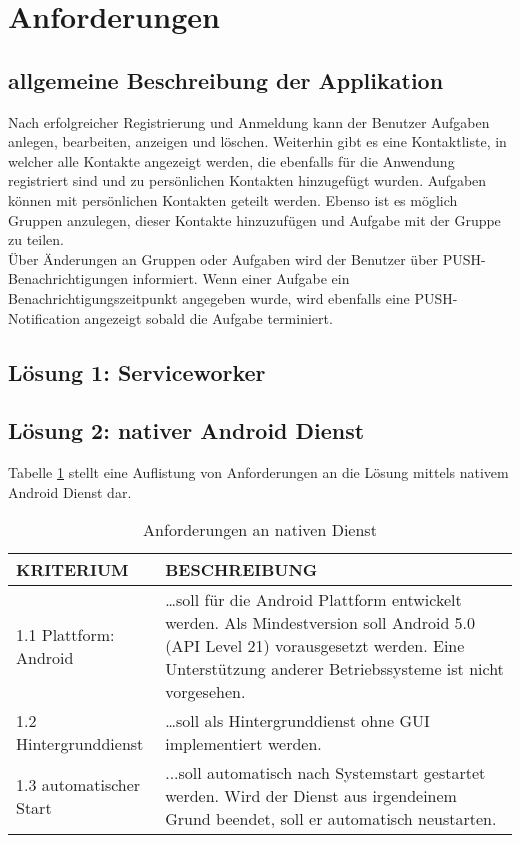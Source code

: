 \section{Anforderungen}

\subsection{allgemeine Beschreibung der Applikation}

Nach erfolgreicher Registrierung und Anmeldung kann der Benutzer Aufgaben anlegen, bearbeiten, anzeigen und löschen. Weiterhin gibt es eine Kontaktliste, in welcher alle Kontakte angezeigt werden, die ebenfalls für die Anwendung registriert sind und zu persönlichen Kontakten hinzugefügt wurden. Aufgaben können mit persönlichen Kontakten geteilt werden. Ebenso ist es möglich Gruppen anzulegen, dieser Kontakte hinzuzufügen und Aufgabe mit der Gruppe zu teilen. \\

Über Änderungen an Gruppen oder Aufgaben wird der Benutzer über PUSH-Benachrichtigungen informiert. Wenn einer Aufgabe ein Benachrichtigungszeitpunkt angegeben wurde, wird ebenfalls eine PUSH-Notification angezeigt sobald die Aufgabe terminiert.


\subsection{Lösung 1: Serviceworker}

\newpage
\subsection{Lösung 2: nativer Android Dienst}

Tabelle \ref{tbl_anforderungen-android} stellt eine Auflistung von Anforderungen an die Lösung mittels nativem Android Dienst dar.
\bgroup
\def\arraystretch{1.5}%
\begin{table}[ht]
\begin{tabularx}{\textwidth}{ |l|X|  }
    \hline
    \textbf{KRITERIUM} & \textbf{BESCHREIBUNG} \\
    \hline
    1.1 Plattform: Android & …soll für die Android Plattform entwickelt werden. Als Mindestversion soll Android 5.0 (API Level 21) vorausgesetzt werden. Eine Unterstützung anderer Betriebssysteme ist nicht vorgesehen.  \\
    \hline
    1.2 Hintergrunddienst & …soll als Hintergrunddienst ohne GUI implementiert werden. \\
    \hline
    1.3 automatischer Start & ...soll automatisch nach Systemstart gestartet werden. Wird der Dienst aus irgendeinem Grund beendet, soll er automatisch neustarten. \\
    \hline
\end{tabularx}
\caption{Anforderungen an nativen Dienst}
\label{tbl_anforderungen-android}
\end{table}
\egroup


